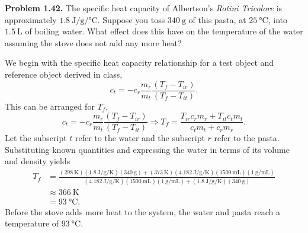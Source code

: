 \documentclass[a4paper, 12pt]{config/homework}
\begin{document}
\bigskip\noindent


\pagebreak\noindent
\textbf{Problem 1.42.} The specific heat capacity of Albertson's \textit{Rotini Tricolore} is approximately \(\qty{1.8}{\joule\per\gram\per\celsius}\). Suppose you toss \(\qty{340}{\gram}\) of this pasta, at \(\qty{25}{\celsius}\), into \(\qty{1.5}{\liter}\) of boiling water. What effect does this have on the temperature of the water assuming the stove does not add any more heat?

\bigskip\noindent
We begin with the specific heat capacity relationship for a test object and reference object derived in class,
\[c_t = -c_r \frac{m_r}{m_t}\frac{\left(T_f - T_{ir}\right)}{\left(T_f - T_{it}\right)}.\]
This can be arranged for \(T_f\),
\[c_t = -c_r \frac{m_r}{m_t}\frac{\left(T_f - T_{ir}\right)}{\left(T_f - T_{it}\right)}
\Rightarrow T_f = \frac{T_{ir}c_r m_r + T_{it}c_t m_t}{c_t m_t + c_r m_r}.\]
Let the subscript \(t\) refer to the water and the subscript \(r\) refer to the pasta. Substituting known quantities and expressing the water in terms of its volume and density yields
\begin{align*}
T_f &= \frac{\left(\qty{298}{\kelvin}\right)\left(\qty{1.8}{\joule\per\gram\per\kelvin}\right)\left(\qty{340}{\gram}\right) + \left(\qty{373}{\kelvin}\right)\left(\qty{4.182}{\joule\per\gram\per\kelvin}\right)\left(\qty{1500}{\milli\liter}\right)\left(\qty{1}{\gram\per\milli\liter}\right)}{\left(\qty{4.182}{\joule\per\gram\per\kelvin}\right)\left(\qty{1500}{\milli\liter}\right)\left(\qty{1}{\gram\per\milli\liter}\right) + \left(\qty{1.8}{\joule\per\gram\per\kelvin}\right)\left(\qty{340}{\gram}\right)}
\\&\approx \qty{366}{\kelvin}
\\&= \qty{93}{\celsius}.
\end{align*}
Before the stove adds more heat to the system, the water and pasta reach a temperature of \(\qty{93}{\celsius}\).
\end{document}
